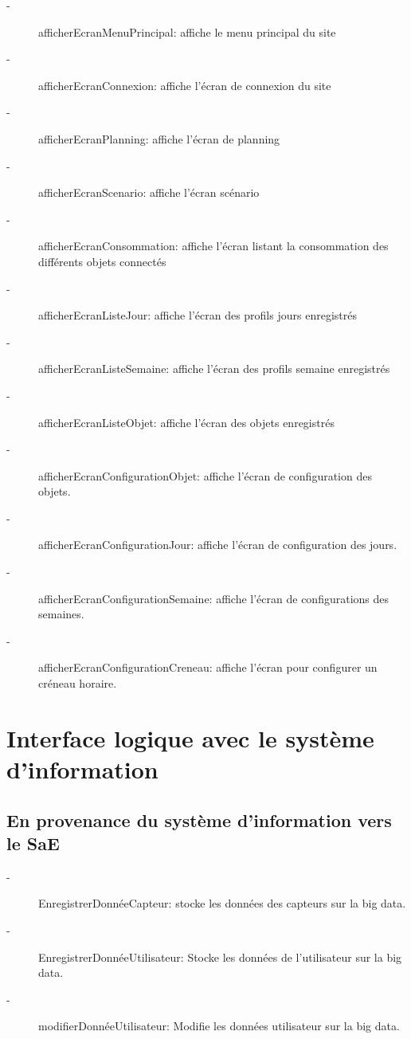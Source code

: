 \documentclass[10pt,a4paper]{report}
\begin{document}
\begin{description}
	\item[-] afficherEcranMenuPrincipal: affiche le menu principal du site
	\item[-] afficherEcranConnexion: affiche l'écran de connexion du site 
	\item[-] afficherEcranPlanning: affiche l'écran de planning
	\item[-] afficherEcranScenario: affiche l'écran scénario
	\item[-] afficherEcranConsommation: affiche l'écran listant la consommation des différents objets connectés
	\item[-] afficherEcranListeJour: affiche l'écran des profils jours enregistrés
	\item[-] afficherEcranListeSemaine: affiche l'écran des profils semaine enregistrés
	\item[-] afficherEcranListeObjet: affiche l'écran des objets enregistrés
	\item[-] afficherEcranConfigurationObjet: affiche l'écran de configuration des objets.
	\item[-] afficherEcranConfigurationJour: affiche l'écran de configuration des jours.
	\item[-] afficherEcranConfigurationSemaine: affiche l'écran de configurations des semaines.
	\item[-] afficherEcranConfigurationCreneau: affiche l'écran pour configurer un créneau horaire.
\end{description}
			
		
		\section{Interface logique avec le système d'information}
			\subsection{En provenance du système d'information vers le SaE}
			
\begin{description}
	\item[-] EnregistrerDonnéeCapteur: stocke les données des capteurs sur la big data.
	\item[-] EnregistrerDonnéeUtilisateur: Stocke les données de l'utilisateur sur la big data.
	\item[-] modifierDonnéeUtilisateur: Modifie les données utilisateur sur la big data.
	
\end{description}
			
\end{document}
